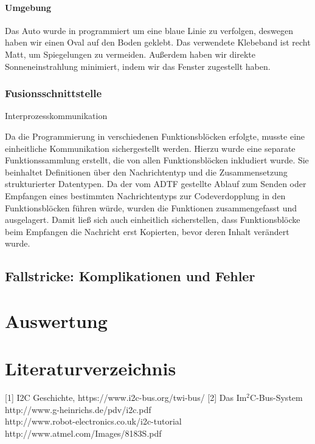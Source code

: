\documentclass[12pt,a4paper]{report}
\begin{document}
\subsubsection{Umgebung}
Das Auto wurde in programmiert um eine blaue Linie zu verfolgen, deswegen haben wir einen Oval auf den Boden geklebt. Das verwendete Klebeband ist recht Matt, um Spiegelungen zu vermeiden. Außerdem haben wir direkte Sonneneinstrahlung minimiert, indem wir das Fenster zugestellt haben.


\subsection{Fusionsschnittstelle}
Interprozesskommunikation

Da die Programmierung in verschiedenen Funktionsblöcken erfolgte, musste eine einheitliche Kommunikation sichergestellt werden. Hierzu wurde eine separate Funktionssammlung erstellt, die von allen Funktionsblöcken inkludiert wurde. Sie beinhaltet Definitionen über den Nachrichtentyp und die Zusammensetzung strukturierter Datentypen. Da der vom ADTF gestellte Ablauf zum Senden oder Empfangen eines bestimmten Nachrichtentyps zur Codeverdopplung in den Funktionsblöcken führen würde, wurden die Funktionen zusammengefasst und ausgelagert. Damit ließ sich auch einheitlich sicherstellen, dass Funktionsblöcke beim Empfangen die Nachricht erst Kopierten, bevor deren Inhalt verändert wurde.

\section{Fallstricke: Komplikationen und Fehler}


\chapter{Auswertung}


\chapter{Literaturverzeichnis}

[1] 	I2C Geschichte,  https://www.i2c-bus.org/twi-bus/
[2]	Das Im$^2$C-Bus-System\\
http://www.g-heinrichs.de/pdv/i2c.pdf\\
http://www.robot-electronics.co.uk/i2c-tutorial\\
http://www.atmel.com/Images/8183S.pdf\\
\end{document}
